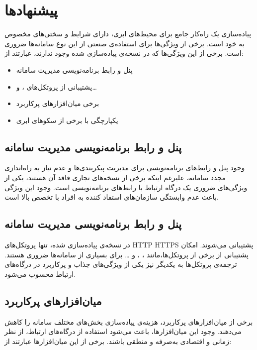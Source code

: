 \section{پیشنهاد‌ها}\label{sec:recom}
پیاده‌سازی یک راه‌کار جامع برای محیط‌های ابری، دارای شرایط و سختی‌های مخصوص به خود است. برخی از ویژگی‌ها برای استفاده‌ی صنعتی از این نوع سامانه‌ها ضروری است. برخی از این ویژگی‌ها که در نسخه‌ی پیاده‌سازی شده وجود ندارند، عبارتند از:

\begin{itemize}
    \item پنل و رابط برنامه‌نویسی مدیریت سامانه
    \item پشتیبانی از پروتکل‌های ،  و\ldots
    \item برخی میان‌افزار‌های پرکاربرد
    \item یکپارچگی با برخی از سکو‌های ابری
\end{itemize}

\subsection{پنل و رابط برنامه‌نویسی مدیریت سامانه}\label{subsec:recom_panel}
وجود پنل و رابط‌های برنامه‌نویسی برای مدیریت پیکر‌بندی‌ها و عدم نیاز به راه‌اندازی مجدد سامانه، علیرغم اینکه برخی از نسخه‌های تجاری فاقد آن هستند، یکی از ویژگی‌های ضروری یک درگاه ارتباط با رابط‌های برنامه‌نویسی است. وجود این ویژگی باعث عدم وابستگی سازمان‌های استفاد کننده به افراد با تخصص بالا است.

\subsection{پنل و رابط برنامه‌نویسی مدیریت سامانه}\label{subsec:recom_protocols}
در نسخه‌ی پیاده‌سازی شده، تنها پروتکل‌های HTTP HTTPS پشتیبانی می‌شوند. امکان پشتیبانی از برخی از پروتکل‌ها،‌مانند ، ،  و … برای بسیاری از سامانه‌ها ضروری هستند.
ترجمه‌ی پروتکل‌ها به یکدیگر نیز یکی از ویژگی‌های جذاب و پرکاربرد در درگاه‌های ارتباط محسوب می‌شود.

\subsection{میان‌افزار‌های پرکاربرد}\label{subsec:recom_middlewares}
برخی از میان‌افزار‌های پرکاربرد، هزینه‌ی پیاده‌سازی بخش‌های مختلف سامانه را کاهش می‌دهند. وجود این میان‌افزار‌ها، باعث می‌شود استفاده از درگاه‌های ارتباط، از نظر زمانی و اقتصادی به‌صرفه‌ و منطقی باشند. برخی از این میان‌افزار‌ها عبارتند از:

